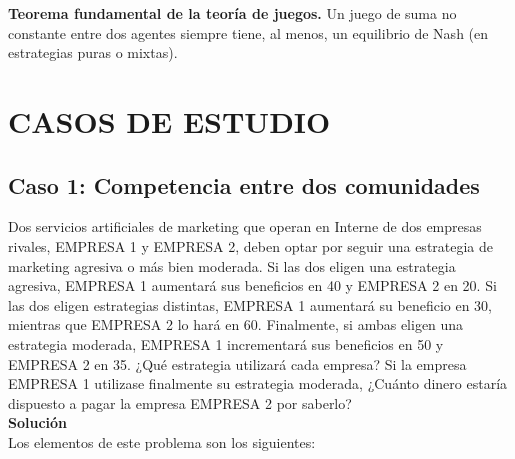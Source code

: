 \begin{theorem}
\textbf{Teorema fundamental de la teoría de juegos.}
Un juego de suma no constante entre dos agentes siempre tiene, al menos, un equilibrio de Nash (en estrategias puras o mixtas).
\end{theorem}

\section{CASOS DE ESTUDIO}\label{Sec:CE_DCA}
\subsection{Caso 1: Competencia entre dos comunidades}
Dos servicios artificiales de marketing que operan en Interne de dos empresas rivales, EMPRESA 1 y EMPRESA 2, deben optar por seguir una estrategia de marketing agresiva o más bien moderada. Si las dos eligen una estrategia agresiva, EMPRESA 1 aumentará sus beneficios en 40 y EMPRESA 2 en 20. Si las dos  eligen estrategias distintas, EMPRESA 1 aumentará su beneficio en 30, mientras que EMPRESA 2 lo hará en 60. Finalmente, si ambas eligen una estrategia moderada, EMPRESA 1 incrementará sus beneficios en 50 y EMPRESA 2  en 35. ¿Qué estrategia utilizará cada empresa? Si la empresa EMPRESA 1 utilizase finalmente su estrategia moderada, ¿Cuánto dinero estaría dispuesto a pagar la empresa EMPRESA 2 por saberlo?
\\
\textbf{Solución}\\
Los elementos de este problema son los siguientes:
\\
